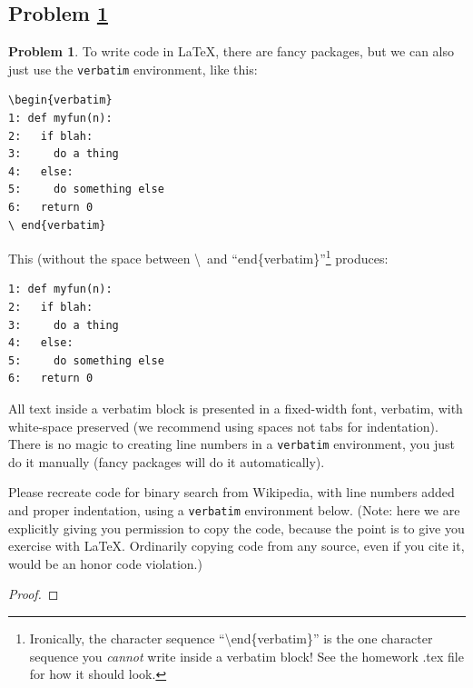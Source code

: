 \documentclass[11pt]{article}
\theoremstyle{definition}
\theoremstyle{definition}
\newtheorem{required}{Problem}
\theoremstyle{definition}
\begin{document}
\subsection{Problem \ref{LatexCode}}
\begin{required} \label{LatexCode}
To write code in LaTeX, there are fancy packages, but we can also just use the \texttt{verbatim} environment, like this:
\begin{verbatim}
\begin{verbatim}
1: def myfun(n):
2:   if blah:
3:     do a thing
4:   else:
5:     do something else
6:   return 0
\ end{verbatim} 
\end{verbatim}
This (without the space between \textbackslash\ and ``end\{verbatim\}''\footnote{Ironically, the character sequence ``\textbackslash end\{verbatim\}'' is the one character sequence you \emph{cannot} write inside a verbatim block! See the homework .tex file for how it should look.} produces:
\begin{verbatim}
1: def myfun(n):
2:   if blah:
3:     do a thing
4:   else:
5:     do something else
6:   return 0
\end{verbatim}
All text inside a verbatim block is presented in a fixed-width font, verbatim, with white-space preserved (we recommend using spaces not tabs for indentation). There is no magic to creating line numbers in a \texttt{verbatim} environment, you just do it manually (fancy packages will do it automatically). 

Please recreate code for binary search from Wikipedia, with line numbers added and proper indentation, using a \texttt{verbatim} environment below. (Note: here we are explicitly giving you permission to copy the code, because the point is to give you exercise with LaTeX. Ordinarily copying code from any source, even if you cite it, would be an honor code violation.)


\begin{proof}
\end{proof}
\end{required}

\newpage
\end{document}
